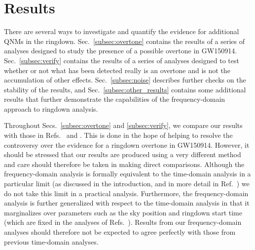 \section{Results}\label{sec:results}

There are several ways to investigate and quantify the evidence for additional QNMs in the ringdown.
Sec.~\ref{subsec:overtone} contains the results of a series of analyses designed to study the presence of a possible overtone in GW150914.
Sec.~\ref{subsec:verify} contains the results of a series of analyses designed to test whether or not what has been detected really is an overtone and is not the accumulation of other effects.
Sec.~\ref{subsec:noise} describes further checks on the stability of the results, and
Sec.~\ref{subsec:other_results} contains some additional results that further demonstrate the capabilities of the frequency-domain approach to ringdown analysis.

Throughout Secs.~\ref{subsec:overtone} and \ref{subsec:verify}, we compare our results with those in Refs.~\cite{Cotesta:2022pci} and \cite{Isi:2022mhy}. 
This is done in the hope of helping to resolve the controversy over the evidence for a ringdown overtone in GW150914. 
However, it should be stressed that our results are produced using a very different method and care should therefore be taken in making direct comparisons.
Although the frequency-domain analysis is formally equivalent to the time-domain analysis in a particular limit (as discussed in the introduction, and in more detail in Ref.~\cite{Finch:2021qph}) we do not take this limit in a practical analysis. Furthermore, the frequency-domain analysis is further generalized with respect to the time-domain analysis in that it marginalizes over parameters such as the sky position and ringdown start time (which are fixed in the analyses of Refs.~\cite{Cotesta:2022pci, Isi:2022mhy}).
Results from our frequency-domain analyses should therefore not be expected to agree perfectly with those from previous time-domain analyses.

